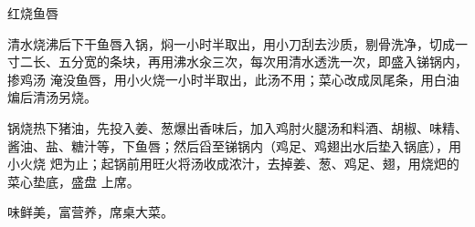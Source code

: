 \begin{recipe}{红烧鱼唇}

\ingredients


\preparation

\step 清水烧沸后下干鱼唇入锅，焖一小时半取出，用小刀刮去沙质，剔骨洗净，切成一
寸二长、五分宽的条块，再用沸水汆三次，每次用清水透洗一次，即盛入锑锅内，掺鸡汤
淹没鱼唇，用小火烧一小时半取出，此汤不用；菜心改成凤尾条，用白油煸后清汤另烧。

\step 锅烧热下猪油，先投入姜、葱爆出香味后，加入鸡肘火腿汤和料酒、胡椒、味精、
酱油、盐、糖汁等，下鱼唇；然后舀至锑锅内（鸡足、鸡翅出水后垫入锅底），用小火烧
𤆵为止；起锅前用旺火将汤收成浓汁，去掉姜、葱、鸡足、翅，用烧𤆵的菜心垫底，盛盘
上席。

\features

味鲜美，富营养，席桌大菜。

\end{recipe}

